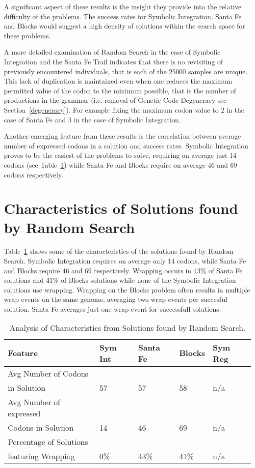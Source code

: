 A significant aspect of these results is the insight they provide into the relative difficulty of the problems. The success rates for Symbolic Integration, Santa Fe and Blocks would suggest a high density of solutions within the search space for these problems.

A more detailed examination of Random Search in the case of Symbolic Integration and the Santa Fe Trail indicates that there is no revisiting of previously encountered individuals, that is each of the 25000 samples are unique. This lack of duplication is maintained even when one reduces the maximum permitted value of the codon to the minimum possible, that is the number of productions in the grammar (i.e. removal of Genetic Code Degeneracy see Section~\ref{degeneracy}). For example fixing the maximum codon value to 2 in the case of Santa Fe and 3 in the case of Symbolic Integration.

Another emerging feature from these results is the correlation between average number of expressed codons in a solution and success rates. Symbolic Integration proves to be the easiest of the problems to solve, requiring on average just 14 codons (see Table~\ref{rs_results_analysis_table}) while Santa Fe and Blocks require on average 46 and 69 codons respectively.

\section{Characteristics of Solutions found by Random Search}
Table~\ref{rs_results_analysis_table} shows some of the characteristics of the solutions found by Random Search. Symbolic Integration requires on average only 14 codons, while Santa Fe and Blocks require 46 and 69 respectively. Wrapping occurs in 43\% of Santa Fe solutions and 41\% of Blocks solutions while none of the Symbolic Integration solutions use wrapping. Wrapping on the Blocks problem often results in multiple wrap events on the same genome, averaging two wrap events per succesful solution. Santa Fe averages just one wrap event for successfull solutions.

\begin{table}[h]
\begin{center}
\begin{tabular}{|l|l|l|l|l|}
\hline
Feature & Sym Int & Santa Fe & Blocks & Sym Reg  \\
\hline
Avg Number of Codons & & & &  \\ 
in Solution & 57 & 57 & 58 & n/a  \\
Avg Number of expressed & & & &  \\
Codons in Solution & 14 & 46 & 69 & n/a  \\
Percentage of Solutions & & & &  \\
featuring Wrapping & 0\% & 43\%  & 41\% & n/a  \\
\hline
\end{tabular}
\caption{\label{rs_results_analysis_table} Analysis of Characteristics from Solutions found by Random Search.}
\end{center}
\end{table}



